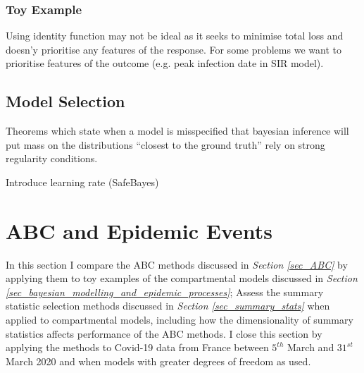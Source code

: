 \documentclass[11pt,a4paper]{article}
\theoremstyle{break}
\begin{document}
\subsubsection{Toy Example}\label{sec_summary_statistics_toy}

  Using identity function may not be ideal as it seeks to minimise total loss and doesn'y prioritise any features of the response. For some problems we want to prioritise features of the outcome (e.g. peak infection date in SIR model).

\subsection{Model Selection}

  \par Theorems which state when a model is misspecified that bayesian inference will put mass on the distributions ``closest to the ground truth'' rely on strong regularity conditions. \cite[]{inconsistency_of_bayesian_inference_for_misspecified_linear_models_and_a_proposal_for_reparing_it}
  \par Introduce learning rate (SafeBayes) \cite[]{inconsistency_of_bayesian_inference_for_misspecified_linear_models_and_a_proposal_for_reparing_it}

\newpage
\section{ABC and Epidemic Events}\label{sec_abc_and_epidemic_events}

  \par In this section I compare the ABC methods discussed in \textit{Section \ref{sec_ABC}} by applying them to toy examples of the compartmental models discussed in \textit{Section \ref{sec_bayesian_modelling_and_epidemic_processes}}; Assess the summary statistic selection methods discussed in \textit{Section \ref{sec_summary_stats}} when applied to compartmental models, including how the dimensionality of summary statistics affects performance of the ABC methods. I close this section by applying the methods to Covid-19 data from France between $5^{th}$ March and $31^{st}$ March 2020 and when models with greater degrees of freedom as used.

\end{document}
